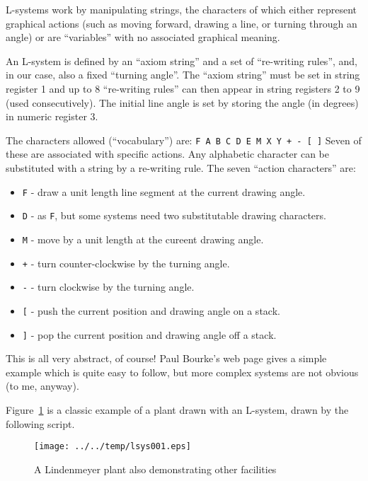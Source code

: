 \documentclass[a4paper,twoside,11pt]{article}
\makeatletter
\def\maxwidth{%
  \ifdim\Gin@nat@width>\linewidth
    \linewidth
  \else
    \Gin@nat@width
  \fi
}
\newcommand{\newpara}{\par\vspace{4mm}\noindent}
\makeatother
\begin{document}
\newpara
L-systems work by manipulating strings, the characters of which either
represent graphical actions (such as moving forward, drawing a line, or
turning through an angle) or are ``variables'' with no associated
graphical meaning.

\newpara
An L-system is defined by an ``axiom string'' and a set of ``re-writing
rules'', and, in our case, also a fixed ``turning angle''. The ``axiom
string'' must be set in string register 1 and up to 8 ``re-writing
rules'' can then appear in string registers 2 to 9 (used consecutively).
The initial line angle is set by storing the angle (in degrees) in
numeric register 3.

\newpara
The characters allowed (``vocabulary'') are:
\texttt{F\ A\ B\ C\ D\ E\ M\ X\ Y\ +\ -\ {[}\ {]}} Seven of these are
associated with specific actions. Any alphabetic character can be
substituted with a string by a re-writing rule. The seven ``action
characters'' are:

\begin{itemize}
\item
  \texttt{F} - draw a unit length line segment at the current drawing
  angle.
\item
  \texttt{D} - as \texttt{F}, but some systems need two substitutable
  drawing characters.
\item
  \texttt{M} - move by a unit length at the cureent drawing angle.
\item
  \texttt{+} - turn counter-clockwise by the turning angle.
\item
  \texttt{-} - turn clockwise by the turning angle.
\item
  \texttt{{[}} - push the current position and drawing angle on a stack.
\item
  \texttt{{]}} - pop the current position and drawing angle off a stack.
\end{itemize}

\newpara
This is all very abstract, of course! Paul Bourke's web page gives a
simple example which is quite easy to follow, but more complex systems
are not obvious (to me, anyway).

\newpara
Figure~\ref{fig:lsys001} is a classic example of a plant drawn with an L-system,
drawn by the following script.

\begin{figure}
  \centering
  \texttt{[image: ../../temp/lsys001.eps]}
  \caption{A Lindenmeyer plant also demonstrating other facilities}
  \label{fig:lsys001}
\end{figure}
\end{document}
